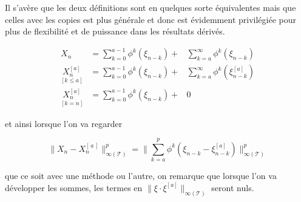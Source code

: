 Il s'avère que les deux définitions sont en quelques sorte \og équivalentes \fg mais que celles avec les copies est plus générale et donc est évidemment privilégiée pour plus de flexibilité et de puissance dans les résultats dérivés.

\begin{equation*}
	\begin{array}{ccc}
	X_n                               & = \sum\limits_{k=0}^{a-1} \phi^k( \xi_{n-k}) + & \sum\limits_{k=a}^{\infty} \phi^k( \xi_{n-k})
	\\
	\underset {[k\leq a]} {X_n^{[a]}} & = \sum\limits_{k=0}^{a-1} \phi^k( \xi_{n-k}) + & \sum\limits_{k=a}^{\infty} \phi^k( \xi_{n-k}^{[a]})
	\\
	\underset {[k = n]} {X_n^{[a]}}   & = \sum\limits_{k=0}^{a-1} \phi^k( \xi_{n-k}) + & 0
	\end{array}
\end{equation*}

et ainsi lorsque l'on va regarder

\begin{equation*}
	{\lVert {X_n} - {X_n^{[\, a \, ]}} } \rVert_{\infty(\mathcal T)}^p= \lVert \sum\limits_{k=a}^p \phi^k( \xi_{n-k} - \xi_{n-k}^{[a]}) \rVert_{\infty(\mathcal T)}^p
\end{equation*}

\noindent que ce soit avec une méthode ou l'autre, on remarque que lorsque l'on va développer les sommes, les termes en $\lVert{\xi \cdot \xi^{[a]}}\rVert_{\infty(\mathcal T)}$ seront nuls.

